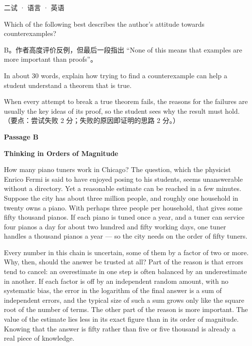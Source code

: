 \documentclass[cjk=noto, seal=first]{mojing-exam}
\begin{document}
\begin{paper}[time={建议 2 小时（训练设置）}, full=100]{二试 · 语言 · 英语}
\begin{questions}
\question[4] Which of the following best describes the author's attitude towards counterexamples? \paren[B]
\begin{solution}
B。作者高度评价反例，但最后一段指出 ``None of this means that examples are more important than proofs''。
\end{solution}

\question[4] In about 30 words, explain how trying to find a counterexample can help a student understand a theorem that is true.
\answerspace{2.5cm}
\begin{solution}
When every attempt to break a true theorem fails, the reasons for the failures are usually the key ideas of its proof,
so the student sees why the result must hold.
（要点：尝试失败 2 分；失败的原因即证明的思路 2 分。）
\end{solution}
\end{questions}

\medskip
\noindent\textbf{Passage B}

\begin{center}\textbf{Thinking in Orders of Magnitude}\end{center}

How many piano tuners work in Chicago? The question, which the physicist Enrico Fermi is said to have enjoyed posing to his students,
seems unanswerable without a directory. Yet a reasonable estimate can be reached in a few minutes. Suppose the city has about three
million people, and roughly one household in twenty owns a piano. With perhaps three people per household, that gives some fifty
thousand pianos. If each piano is tuned once a year, and a tuner can service four pianos a day for about two hundred and fifty working
days, one tuner handles a thousand pianos a year --- so the city needs on the order of fifty tuners.

Every number in this chain is uncertain, some of them by a factor of two or more. Why, then, should the answer be trusted at all?
Part of the reason is that errors tend to cancel: an overestimate in one step is often balanced by an underestimate in another.
If each factor is off by an independent random amount, with no systematic bias, the error in the logarithm of the final answer is a
sum of independent errors, and the typical size of such a sum grows only like the square root of the number of terms. The other part of the reason is more important. The value of the estimate lies less in its exact
figure than in its order of magnitude. Knowing that the answer is fifty rather than five or five thousand is already a real piece of
knowledge.


\end{paper}
\end{document}
